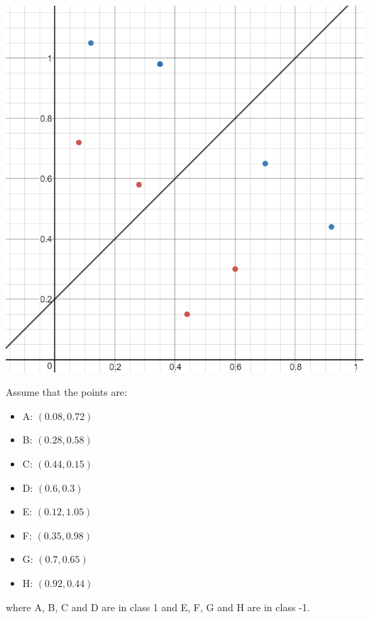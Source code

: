 \documentclass[12pt, letterpaper]{article}
\begin{document}
	\includegraphics[scale=0.6]{"Problem 4/Initial Linear Separator"}
	
	\medskip 
	\noindent Assume that the points are:
	\begin{itemize}
		\item A: $(0.08, 0.72)$
		\item B: $(0.28, 0.58)$
		\item C: $(0.44, 0.15)$
		\item D: $(0.6, 0.3)$
		\item E: $(0.12, 1.05)$
		\item F: $(0.35, 0.98)$
		\item G: $(0.7, 0.65)$
		\item H: $(0.92, 0.44)$	
	\end{itemize}
	where A, B, C and D are in class 1 and E, F, G and H are in class -1. 	 
	
\end{document}
